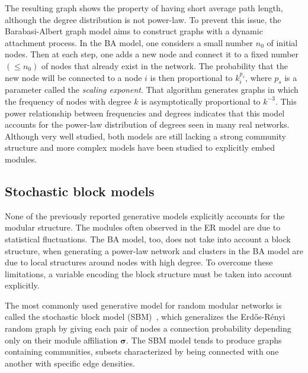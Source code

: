 The resulting graph shows the property of having short average path length, although the degree distribution is not power-law.
To prevent this issue, the Barabasi-Albert graph model aims to construct graphs with a dynamic attachment process.
In the BA model, one considers a small number $n_0$ of initial nodes.
Then at each step, one adds a new node and connect it to a fixed number $(\leq n_0)$ of nodes that already exist in the network.
The probability that the new node will be connected to a node $i$ is then proportional to $k_i^{p_s}$,  where $p_s$ is a parameter called the \emph{scaling exponent}.
That algorithm generates graphs in which the frequency of nodes with degree $k$ is asymptotically proportional to ${k}^{-3}$.
This power relationship between frequencies and degrees indicates that this model accounts for the power-law distribution of degrees seen in many real networks.
Although very well studied, both models are still lacking a strong community structure and more complex models have been studied to explicitly embed modules.

\subsection{Stochastic block models}\label{sec:sbm}
None of the previously reported generative models explicitly accounts for the modular structure.
The modules often observed in the ER model are due to statistical fluctuations.
The BA model, too, does not take into account a block structure, when generating a power-law network and clusters in the BA model are due to local structures around nodes with high degree.
To overcome these limitations, a variable encoding the block structure must be taken into account explicitly.

The most commonly used generative model for random modular networks is called the stochastic block model (SBM)~\cite{holland1983}, which generalizes the Erd\H{o}s-Rényi random graph by giving each pair of nodes a connection probability depending only on their module affiliation $\boldsymbol \sigma$.
The SBM model tends to produce graphs containing communities, subsets characterized by being connected with one another with specific edge densities.

